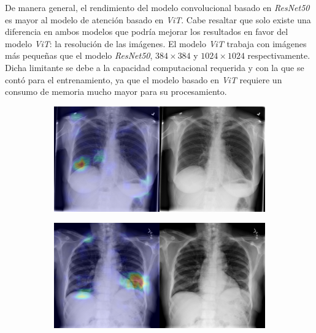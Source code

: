 De manera general, el rendimiento del modelo convolucional basado en \textit{ResNet50} es mayor al
modelo de atención basado en \textit{ViT}. Cabe resaltar que solo existe una diferencia en ambos modelos
que podría mejorar los resultados en favor del modelo \textit{ViT}: la resolución de las imágenes. El
modelo \textit{ViT} trabaja con imágenes más pequeñas que el modelo \textit{ResNet50}, $384\times384$ y
$1024\times1024$ respectivamente. Dicha limitante se debe a la capacidad computacional requerida y con la
que se contó para el entrenamiento, ya que el modelo basado en \textit{ViT} requiere un consumo de memoria
mucho mayor para su procesamiento.


\begin{figure}[b]
    \centering
    \begin{subfigure}{0.4\textwidth}
        \centering
        \includegraphics[width=1.0\textwidth]{Chapters/5. Conclusiones/img/Atelectasis/1_1_00000147_001.png}
    \end{subfigure}
    \begin{subfigure}{0.4\textwidth}
        \centering
        \includegraphics[width=1.0\textwidth]{Chapters/5. Conclusiones/img/Atelectasis/1_1_00000149_002.png}
    \end{subfigure}

\end{figure}
